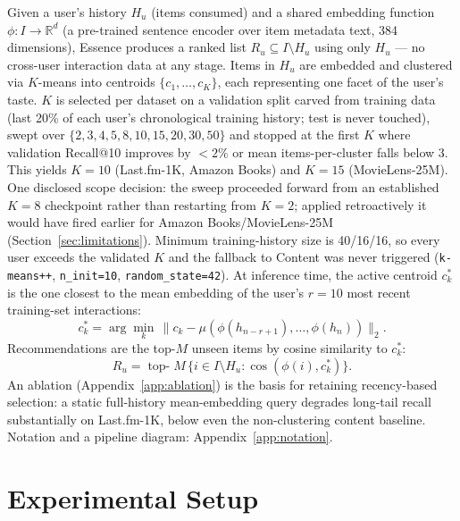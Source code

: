 \documentclass{article}
\begin{document}
Given a user's history $H_u$ (items consumed) and a shared embedding function $\phi: I \to \mathbb{R}^d$ (a pre-trained sentence encoder over item metadata text, 384 dimensions), Essence produces a ranked list $R_u \subseteq I \setminus H_u$ using only $H_u$ --- no cross-user interaction data at any stage. Items in $H_u$ are embedded and clustered via $K$-means into centroids $\{c_1,\ldots,c_K\}$, each representing one facet of the user's taste. $K$ is selected per dataset on a validation split carved from training data (last 20\% of each user's chronological training history; test is never touched), swept over $\{2,3,4,5,8,10,15,20,30,50\}$ and stopped at the first $K$ where validation Recall@10 improves by $<2\%$ or mean items-per-cluster falls below 3. This yields $K=10$ (Last.fm-1K, Amazon Books) and $K=15$ (MovieLens-25M). One disclosed scope decision: the sweep proceeded forward from an established $K=8$ checkpoint rather than restarting from $K=2$; applied retroactively it would have fired earlier for Amazon Books/MovieLens-25M (Section~\ref{sec:limitations}). Minimum training-history size is 40/16/16, so every user exceeds the validated $K$ and the fallback to Content was never triggered (\texttt{k-means++}, \texttt{n\_init=10}, \texttt{random\_state=42}). At inference time, the active centroid $c_k^*$ is the one closest to the mean embedding of the user's $r=10$ most recent training-set interactions:
\begin{equation}
  c_k^* = \arg\min_k \, \bigl\| c_k - \mu(\phi(h_{n-r+1}), \ldots, \phi(h_n)) \bigr\|_2 .
  \label{eq:active}
\end{equation}
Recommendations are the top-$M$ unseen items by cosine similarity to $c_k^*$:
\begin{equation}
  R_u = \operatorname{top-}M \, \bigl\{ i \in I \setminus H_u : \cos(\phi(i), c_k^*) \bigr\} .
  \label{eq:reco}
\end{equation}
An ablation (Appendix~\ref{app:ablation}) is the basis for retaining recency-based selection: a static full-history mean-embedding query degrades long-tail recall substantially on Last.fm-1K, below even the non-clustering content baseline. Notation and a pipeline diagram: Appendix~\ref{app:notation}.

\section{Experimental Setup}
\label{sec:setup}
\end{document}
